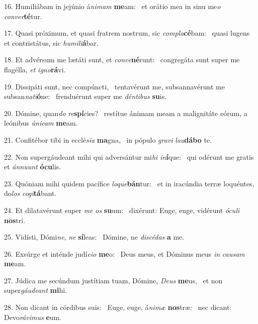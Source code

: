 16. Humiliábam in jejúnio á\textit{ni}\textit{mam} \textbf{me}am: \ast\  et orátio mea in sinu me\textit{o} \textit{con}\textit{ver}\textbf{té}tur.\

17. Quasi próximum, et quasi fratrem nostrum, sic \textit{com}\textit{pla}\textbf{cé}bam: \ast\  quasi lugens et contristátus, sic \textit{hu}\textit{mi}\textit{li}\textbf{á}bar.\

18. Et advérsum me lætáti sunt, et \textit{con}\textit{ve}\textbf{né}runt: \ast\  congregáta sunt super me flagélla, \textit{et} \textit{i}\textit{gno}\textbf{rá}vi.\

19. Dissipáti sunt, nec compúncti, \dag\  tentavérunt me, subsannavérunt me subsan\textit{na}\textit{ti}\textbf{ó}ne: \ast\  frenduérunt super me \textit{dén}\textit{ti}\textit{bus} \textbf{su}is.\

20. Dómine, quan\textit{do} \textit{re}\textbf{spí}cies? \ast\  restítue ánimam meam a malignitáte eórum, a leónibus \textit{ú}\textit{ni}\textit{cam} \textbf{me}am.\

21. Confitébor tibi in ecclé\textit{si}\textit{a} \textbf{ma}gna, \ast\  in pópulo \textit{gra}\textit{vi} \textit{lau}\textbf{dá}\textbf{bo} te.\

22. Non supergáudeant mihi qui adversántur mi\textit{hi} \textit{in}\textbf{í}que: \ast\  qui odérunt me gratis et \textit{án}\textit{nu}\textit{unt} \textbf{ó}\textbf{cu}lis.\

23. Quóniam mihi quidem pacífice \textit{lo}\textit{que}\textbf{bán}tur: \ast\  et in iracúndia terræ loquéntes, do\textit{los} \textit{co}\textit{gi}\textbf{tá}bant.\

24. Et dilatavérunt super \textit{me} \textit{os} \textbf{su}um: \ast\  dixérunt: Euge, euge, vidérunt \textit{ó}\textit{cu}\textit{li} \textbf{nos}tri.\

25. Vidísti, Dómi\textit{ne}, \textit{ne} \textbf{sí}leas: \ast\  Dómine, ne \textit{di}\textit{scé}\textit{das} \textbf{a} me.\

26. Exsúrge et inténde judí\textit{ci}\textit{o} \textbf{me}o: \ast\  Deus meus, et Dóminus meus \textit{in} \textit{cau}\textit{sam} \textbf{me}am.\

27. Júdica me secúndum justítiam tuam, Dómine, \textit{De}\textit{us} \textbf{me}us, \ast\  et non super\textit{gáu}\textit{de}\textit{ant} \textbf{mi}hi.\

28. Non dicant in córdibus suis: \dag\  Euge, euge, á\textit{ni}\textit{mæ} \textbf{nos}træ: \ast\  nec dicant: Devo\textit{rá}\textit{vi}\textit{mus} \textbf{e}um.\

